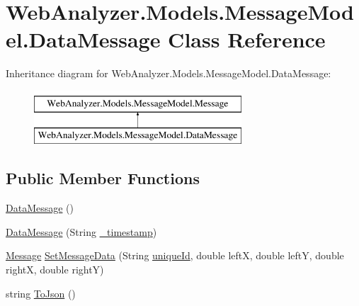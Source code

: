 \hypertarget{class_web_analyzer_1_1_models_1_1_message_model_1_1_data_message}{}\section{Web\+Analyzer.\+Models.\+Message\+Model.\+Data\+Message Class Reference}
\label{class_web_analyzer_1_1_models_1_1_message_model_1_1_data_message}
Inheritance diagram for Web\+Analyzer.\+Models.\+Message\+Model.\+Data\+Message\+:\begin{figure}[H]
\begin{center}
\leavevmode
\includegraphics[height=2.000000cm]{class_web_analyzer_1_1_models_1_1_message_model_1_1_data_message}
\end{center}
\end{figure}
\subsection*{Public Member Functions}
\begin{DoxyCompactItemize}
\item 
\hyperlink{class_web_analyzer_1_1_models_1_1_message_model_1_1_data_message_a3596e43b8f10bd9d32a939875cf9cfea}{Data\+Message} ()
\item 
\hyperlink{class_web_analyzer_1_1_models_1_1_message_model_1_1_data_message_ac53ee1357e1980fd25ebeae30cee1014}{Data\+Message} (String \hyperlink{class_web_analyzer_1_1_models_1_1_message_model_1_1_message_ae1e243f35e213e08ec2bdc54f64b0d2e}{\+\_\+timestamp})
\item 
\hyperlink{class_web_analyzer_1_1_models_1_1_message_model_1_1_message}{Message} \hyperlink{class_web_analyzer_1_1_models_1_1_message_model_1_1_data_message_ae33b7a50587d1e3579881f21660ac450}{Set\+Message\+Data} (String \hyperlink{_u_i_2_h_t_m_l_resources_2js_2lib_2underscore_8min_8js_af690ff5521d79c7128861033ae80ae17}{unique\+Id}, double left\+X, double left\+Y, double right\+X, double right\+Y)
\item 
string \hyperlink{class_web_analyzer_1_1_models_1_1_message_model_1_1_data_message_a0bd5c0828f6293f800603e292af890ce}{To\+Json} ()
\end{DoxyCompactItemize}

